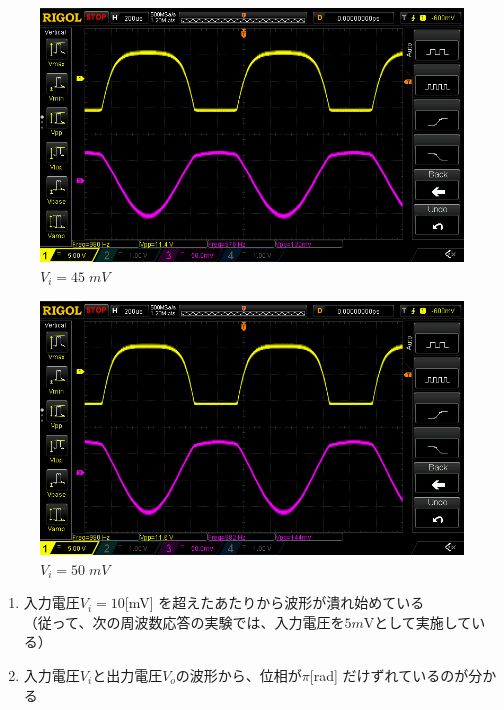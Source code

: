 \documentclass[uplatex,a4paper,11pt,oneside,openany]{jsbook}
\begin{document}
\begin{spacing}{0.71}
\begin{multicols}{2}
  \begin{figure}[H]
     \centering
      \includegraphics[keepaspectratio, scale=0.28, angle=0]
                  {rigol/figs/IOCharM1Y1_2kR/45mV.png}
                  \caption{$V_i=45\;mV$}
                  \label{fig:ioc45}
  \end{figure}

  \begin{figure}[H]
     \centering
      \includegraphics[keepaspectratio, scale=0.28, angle=0]
                {rigol/figs/IOCharM1Y1_2kR/50mV.png}
                \caption{$V_i=50\;mV$}
                \label{fig:ioc50}
  \end{figure}
\end{multicols}
\end{spacing}

\begin{enumerate}
\item[(1)] 入力電圧$V_i=10$[mV] を超えたあたりから波形が潰れ始めている\\
（従って、次の周波数応答の実験では、入力電圧を$5m$Vとして実施している）
\item[(2)] 入力電圧$V_i$と出力電圧$V_o$の波形から、位相が$\pi$[rad] だけずれているのが分かる
\end{enumerate}
\end{document}
